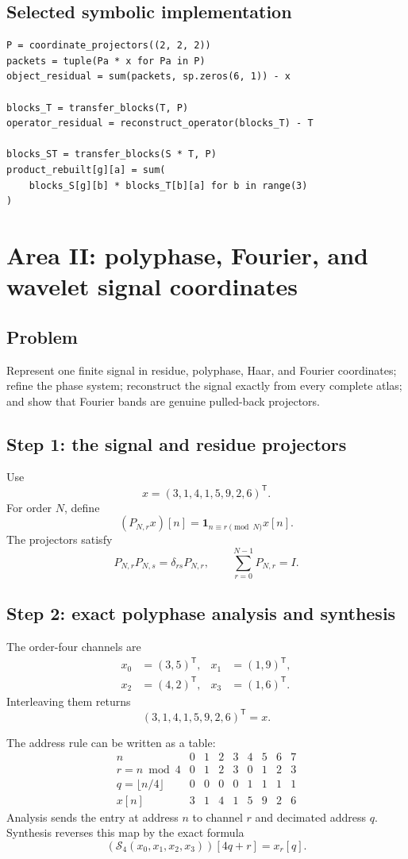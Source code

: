 \documentclass[11pt,oneside]{book}
\theoremstyle{definition}
\theoremstyle{remark}
\newcommand{\Scal}{\mathcal S}
\begin{document}
\section{Selected symbolic implementation}
\begin{lstlisting}
P = coordinate_projectors((2, 2, 2))
packets = tuple(Pa * x for Pa in P)
object_residual = sum(packets, sp.zeros(6, 1)) - x

blocks_T = transfer_blocks(T, P)
operator_residual = reconstruct_operator(blocks_T) - T

blocks_ST = transfer_blocks(S * T, P)
product_rebuilt[g][a] = sum(
    blocks_S[g][b] * blocks_T[b][a] for b in range(3)
)
\end{lstlisting}

\chapter{Area II: polyphase, Fourier, and wavelet signal coordinates}\label{ch:signal}

\section{Problem}
Represent one finite signal in residue, polyphase, Haar, and Fourier coordinates; refine the phase system; reconstruct the signal exactly from every complete atlas; and show that Fourier bands are genuine pulled-back projectors.

\section{Step 1: the signal and residue projectors}
Use
\[
x=(3,1,4,1,5,9,2,6)^{\mathsf T}.
\]
For order $N$, define
\[
(P_{N,r}x)[n]=\mathbf1_{n\equiv r\pmod N}x[n].
\]
The projectors satisfy
\[
P_{N,r}P_{N,s}=\delta_{rs}P_{N,r},
\qquad
\sum_{r=0}^{N-1}P_{N,r}=I.
\]

\section{Step 2: exact polyphase analysis and synthesis}
The order-four channels are
\[
\begin{aligned}
x_0&=(3,5)^{\mathsf T},&x_1&=(1,9)^{\mathsf T},\\
x_2&=(4,2)^{\mathsf T},&x_3&=(1,6)^{\mathsf T}.
\end{aligned}
\]
Interleaving them returns
\[
(3,1,4,1,5,9,2,6)^{\mathsf T}=x.
\]

The address rule can be written as a table:
\[
\begin{array}{c|cccccccc}
n&0&1&2&3&4&5&6&7\\
\hline
r=n\bmod4&0&1&2&3&0&1&2&3\\
q=\lfloor n/4\rfloor&0&0&0&0&1&1&1&1\\
x[n]&3&1&4&1&5&9&2&6
\end{array}
\]
Analysis sends the entry at address $n$ to channel $r$ and decimated address $q$.  Synthesis reverses this map by the exact formula
\[
(\Scal_4(x_0,x_1,x_2,x_3))[4q+r]=x_r[q].
\]
\end{document}
